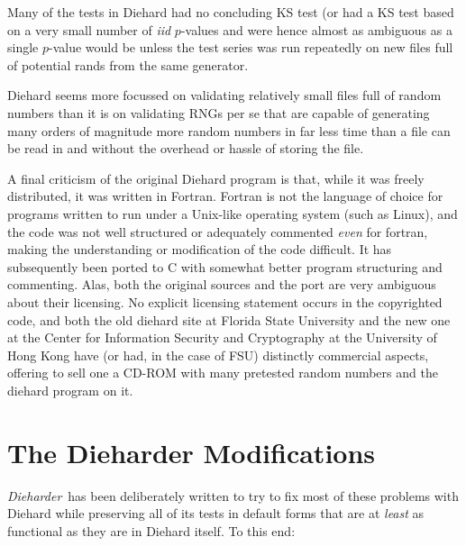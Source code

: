 \documentclass[12pt]{book}
\newcommand{\die}{\emph{Dieharder}\ }
\begin{document}
Many of the tests in Diehard had no concluding KS test (or had a KS test
based on a very small number of {\em iid} $p$-values and were hence
almost as ambiguous as a single $p$-value would be unless the test
series was run repeatedly on new files full of potential rands from the
same generator.  

Diehard seems more focussed on validating relatively small files full of
random numbers than it is on validating RNGs per se that are capable of
generating many orders of magnitude more random numbers in far less time
than a file can be read in and without the overhead or hassle of storing
the file.

A final criticism of the original Diehard program is that, while it was
freely distributed, it was written in Fortran.  Fortran is not the
language of choice for programs written to run under a Unix-like
operating system (such as Linux), and the code was not well structured
or adequately commented {\em even} for fortran, making the understanding
or modification of the code difficult.  It has subsequently been ported
to C\cite{hkproj} with somewhat better program structuring and
commenting.  Alas, both the original sources and the port are very
ambiguous about their licensing.  No explicit licensing statement occurs
in the copyrighted code, and both the old diehard site at Florida State
University and the new one at the Center for Information Security and
Cryptography at the University of Hong Kong have (or had, in the case of
FSU) distinctly commercial aspects, offering to sell one a CD-ROM with
many pretested random numbers and the diehard program on it.

\section{The Dieharder Modifications}

\die has been deliberately written to try to fix most of these problems
with Diehard while preserving all of its tests in default forms that are
at {\em least} as functional as they are in Diehard itself.  To this
end:
\end{document}
